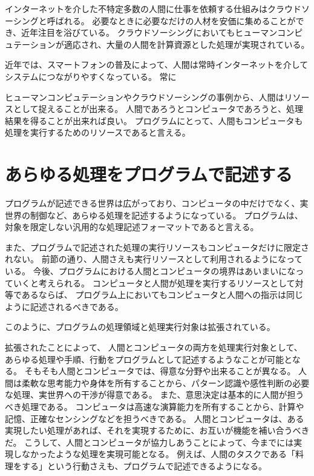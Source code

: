 インターネットを介した不特定多数の人間に仕事を依頼する仕組みはクラウドソーシングと呼ばれる。
必要なときに必要なだけの人材を安価に集めることができ、近年注目を浴びている。
クラウドソーシングにおいてもヒューマンコンピュテーションが適応され、大量の人間を計算資源とした処理が実現されている。

近年では、スマートフォンの普及によって、人間は常時インターネットを介してシステムにつながりやすくなっている。
常に

ヒューマンコンピュテーションやクラウドソーシングの事例から、人間はリソースとして捉えることが出来る。
人間であろうとコンピュータであろうと、処理結果を得ることが出来れば良い。
プログラムにとって、人間もコンピュータも処理を実行するためのリソースであると言える。

\section{あらゆる処理をプログラムで記述する}\label{ux3042ux3089ux3086ux308bux51e6ux7406ux3092ux30d7ux30edux30b0ux30e9ux30e0ux3067ux8a18ux8ff0ux3059ux308b}

プログラムが記述できる世界は広がっており、コンピュータの中だけでなく、実世界の制御など、あらゆる処理を記述するようになっている。
プログラムは、対象を限定しない汎用的な処理記述フォーマットであると言える。

また、プログラムで記述された処理の実行リソースもコンピュータだけに限定されない。
前節の通り、人間さえも実行リソースとして利用されるようになっている。
今後、プログラムにおける人間とコンピュータの境界はあいまいになっていくと考えられる。
コンピュータと人間が処理を実行するリソースとして対等であるならば、
プログラム上においてもコンピュータと人間への指示は同じように記述されるべきである。

\cite{man-computer-symbiosis}
このように、プログラムの処理領域と処理実行対象は拡張されている。

拡張されたことによって、
人間とコンピュータの両方を処理実行対象として、あらゆる処理や手順、行動をプログラムとして記述するようなことが可能となる。
そもそも人間とコンピュータでは、得意な分野や出来ることが異なる。
人間は柔軟な思考能力や身体を所有することから、パターン認識や感性判断の必要な処理、実世界への干渉が得意である。
また、意思決定は基本的に人間が担うべき処理である。
コンピュータは高速な演算能力を所有することから、計算や記憶、正確なセンシングなどを担うべきである。
人間とコンピュータは、ある実現したい処理があれば、それを実現するために、お互いが機能を補い合うべきだ。
こうして、人間とコンピュータが協力しあうことによって、今までには実現しなかったような処理を実現可能となる。
例えば、人間のタスクである「料理をする」という行動さえも、プログラムで記述できるようになる。

